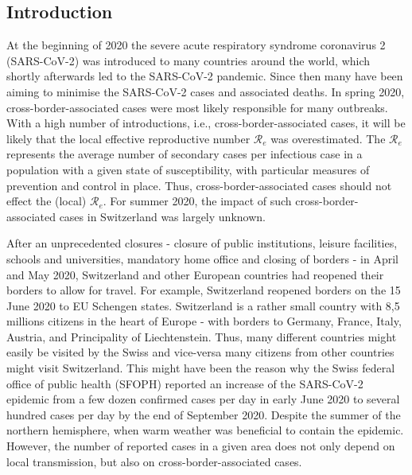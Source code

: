\documentclass[10pt, a4paper, twoside]{article}
\begin{document}
\begin{multicols}{2}
\section{Introduction}

\lhead{ }
At the beginning of 2020 the severe acute respiratory syndrome coronavirus 2 (SARS-CoV-2) was introduced to many countries around the world, which shortly afterwards led to the SARS-CoV-2 pandemic.
Since then many have been aiming to minimise the SARS-CoV-2 cases and associated deaths.
In spring 2020, cross-border-associated cases were most likely responsible for many outbreaks.\cite{russell_effect_2021}
With a high number of introductions, i.e., cross-border-associated cases, it will be likely that the local effective reproductive number $\mathcal{R}_e$ was overestimated.\cite{roberts_early_2011}
The $\mathcal{R}_e$ represents the average number of secondary cases per infectious case in a population with a given state of susceptibility, with particular measures of prevention and control in place.
Thus, cross-border-associated cases should not effect the (local) $\mathcal{R}_e$.
For summer 2020, the impact of such cross-border-associated cases in Switzerland was largely unknown.

After an unprecedented closures - closure of public institutions, leisure facilities, schools and universities, mandatory home office and closing of borders -  in April and May 2020, Switzerland and other European countries had reopened their borders to allow for travel.
For example, Switzerland reopened borders on the 15 June 2020 to EU Schengen states.
Switzerland is a rather small country with 8,5 millions citizens in the heart of Europe - with borders to Germany, France, Italy, Austria, and Principality of Liechtenstein.
Thus, many different countries might easily be visited by the Swiss and vice-versa many citizens from other countries might visit Switzerland.
This might have been the reason why the Swiss federal office of public health (SFOPH) reported an increase of the SARS-CoV-2 epidemic from a few dozen confirmed cases per day in early June 2020 to several hundred cases per day by the end of September 2020.
Despite the summer of the northern hemisphere, when warm weather was beneficial to contain the epidemic.\cite{neher_potential_2020} 
However, the number of reported cases in a given area does not only depend on local transmission, but also on cross-border-associated cases.


\end{multicols}
\end{document}
